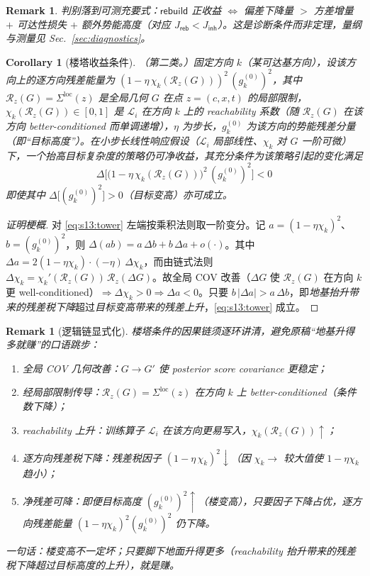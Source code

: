 \documentclass[11pt,a4paper]{article}
\newtheorem{corollary}[theorem]{Corollary}
\newtheorem{remark}[theorem]{Remark}
\newcommand{\cL}{\mathcal{L}}   %
\newcommand{\Rstr}{\mathcal{R}}     %
\begin{document}
\begin{remark}\label{rem:s13:condition}
判别落到\emph{可测}充要式：$\textsf{rebuild}$ 正收益 $\iff$ 偏差下降量 $>$ 方差增量 $+$ 可达性损失 $+$ 额外势能高度（对应 $J_{\textsf{reb}}<J_{\textsf{inh}}$）。这是诊断条件而非定理，量纲与测量见 Sec.~\ref{sec:diagnostics}。
\end{remark}

\begin{corollary}[楼塔收益条件]\label{cor:s13:tower}
（第二类。）固定方向 $k$（某可达基方向），设该方向上的逐方向残差能量为 $(1-\eta\,\chi_k(\Rstr_z(G)))^2\,(g_k^{(0)})^2$，其中 $\Rstr_z(G)=\Sigma^{\mathrm{loc}}(z)$ 是全局几何 $G$ 在点 $z=(c,x,t)$ 的局部限制，$\chi_k(\Rstr_z(G))\in[0,1]$ 是 $\cL_i$ 在方向 $k$ 上的 reachability 系数（随 $\Rstr_z(G)$ 在该方向 better-conditioned 而单调递增），$\eta$ 为步长，$g_k^{(0)}$ 为该方向的势能残差分量（即“目标高度”）。在小步长线性响应假设（$\cL_i$ 局部线性、$\chi_k$ 对 $G$ 一阶可微）下，一个抬高目标复杂度的策略仍可净收益，其充分条件为该策略引起的变化满足
\begin{equation}\label{eq:s13:tower}
\boxed{\,\Delta\!\Big[\big(1-\eta\,\chi_k(\Rstr_z(G))\big)^2\,(g_k^{(0)})^2\Big]<0\,}
\end{equation}
即使其中 $\Delta\big[(g_k^{(0)})^2\big]>0$（目标变高）亦可成立。
\end{corollary}

\begin{proof}[证明梗概]
对 \eqref{eq:s13:tower} 左端按乘积法则取一阶变分。记 $a=(1-\eta\chi_k)^2$、$b=(g_k^{(0)})^2$，则 $\Delta(ab)=a\,\Delta b+b\,\Delta a+o(\cdot)$。其中 $\Delta a=2(1-\eta\chi_k)\cdot(-\eta)\,\Delta\chi_k$，而由链式法则 $\Delta\chi_k=\chi_k'(\Rstr_z(G))\,\Rstr_z(\Delta G)$。故全局 COV 改善（$\Delta G$ 使 $\Rstr_z(G)$ 在方向 $k$ 更 well-conditioned）$\Rightarrow\Delta\chi_k>0\Rightarrow\Delta a<0$。只要 $b\,|\Delta a|>a\,\Delta b$，即\emph{地基抬升带来的残差税下降}超过\emph{目标变高带来的残差上升}，\eqref{eq:s13:tower} 成立。
\end{proof}

\begin{remark}[逻辑链显式化]\label{rem:s13:chain}
楼塔条件的因果链须逐环讲清，避免原稿“地基升得多就赚”的口语跳步：
\begin{enumerate}\setlength\itemsep{1pt}
\item 全局 COV 几何改善：$G\to G'$ 使 posterior score covariance 更稳定；
\item 经局部限制传导：$\Rstr_z(G)=\Sigma^{\mathrm{loc}}(z)$ 在方向 $k$ 上 better-conditioned（条件数下降）；
\item reachability 上升：训练算子 $\cL_i$ 在该方向更易写入，$\chi_k(\Rstr_z(G))\uparrow$；
\item 逐方向残差税下降：残差税因子 $(1-\eta\,\chi_k)^2\downarrow$（因 $\chi_k\to$ 较大值使 $1-\eta\chi_k$ 趋小）；
\item 净残差可降：即便目标高度 $(g_k^{(0)})^2\uparrow$（楼变高），只要因子下降占优，逐方向残差能量 $(1-\eta\chi_k)^2(g_k^{(0)})^2$ 仍下降。
\end{enumerate}
一句话：楼变高不一定坏；只要脚下地面升得更多（reachability 抬升带来的残差税下降超过目标高度的上升），就是赚。
\end{remark}
\end{document}
